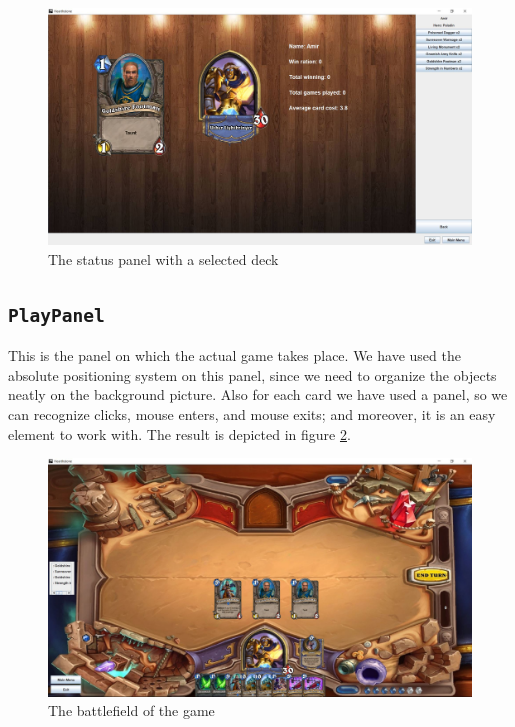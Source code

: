 \documentclass[a4paper]{article}
\begin{document}
\begin{figure}[h!]
	\centering
	\includegraphics[scale=0.4]{statusPanel2.JPG}
	\caption{The status panel with a selected deck}
	\label{stat2}
\end{figure}

\subsection{\texttt{PlayPanel}}
This is the panel on which the actual game takes place. We have used the absolute positioning system on this panel, since we need to organize the objects neatly on the background picture. Also for each card we have used a panel, so we can recognize clicks, mouse enters, and mouse exits; and moreover, it is an easy element to work with. The result is depicted in figure \ref{playPanel}.
\begin{figure}[h!]
	\centering
	\includegraphics[scale=0.4]{playPanel.JPG}
	\caption{The battlefield of the game}
	\label{playPanel}
\end{figure}

\clearpage
\end{document}
